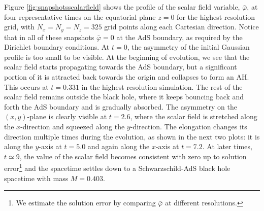\documentclass[a4paper,11pt]{article}
\numberwithin{equation}{section}
\begin{document}
Figure \ref{fig:snapshotsscalarfield} shows the profile of the scalar field variable, $\bar{\varphi}$, at four representative times on the equatorial plane $z=0$ for the highest resolution grid, with $N_x=N_y=N_z=325$ grid points along each Cartesian direction. Notice that in all of these snapshots $\bar{\varphi}=0$ at the AdS boundary, as required by the Dirichlet boundary conditions. At $t=0$, the asymmetry of the initial Gaussian profile is too small to be visible. At the beginning of evolution, we see that the scalar field starts propagating towards the AdS boundary, but a significant portion of it is attracted back towards the origin and collapses to form an AH. This occurs at $t=0.331$ in the highest resolution simulation. The rest of the scalar field remains outside the black hole, where it keeps bouncing back and forth the AdS boundary and is gradually absorbed.
The asymmetry on the $(x,y)$-plane is clearly visible at $t=2.6$, where the scalar field is stretched along the $x$-direction and squeezed along the $y$-direction. The elongation changes its direction multiple times during the evolution, as shown in the next two plots: it is along the $y$-axis at $t=5.0$ and again along the $x$-axis at $t=7.2$. 
At later times, $t\simeq 9$, the value of the scalar field becomes consistent with zero up to solution error\footnote{We estimate the solution error by comparing $\bar{\varphi}$ at different resolutions.} and the spacetime settles down to a Schwarzschild-AdS black hole spacetime with mass $M=0.403$.
\end{document}
